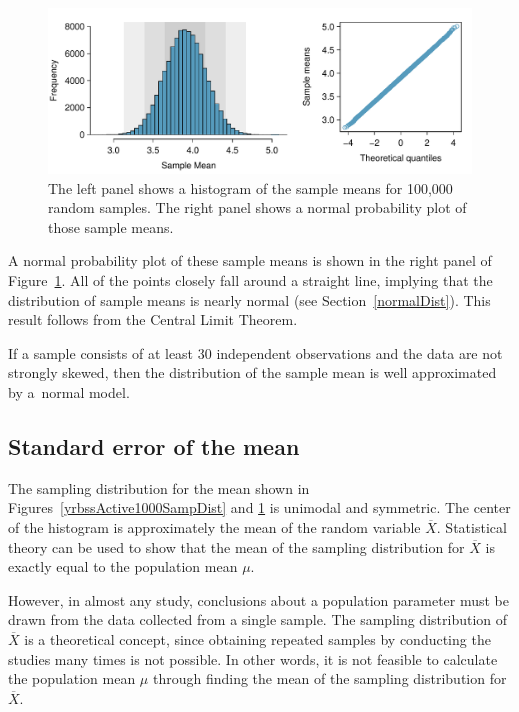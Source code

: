 \begin{spacing}{1.5}
\begin{figure}[hht]
 	\centering
 	\includegraphics[width=\textwidth]
 	{ch_inference_foundations_oi_biostat/figures/yrbssActiveBigSampDist/yrbssActiveBigSampDist}
 	\caption{The left panel shows a histogram of the sample means for 100,000 random samples. The right panel shows a normal probability plot of those sample means.}
 	\label{yrbssActiveBigSampDist}
\end{figure}
 
 A normal probability plot of these sample means is shown in the right panel of Figure~\ref{yrbssActiveBigSampDist}. All of the points closely fall around a straight line, implying that the distribution of sample means is nearly normal (see Section~\ref{normalDist}). This result follows from the Central Limit Theorem.
 
 \begin{termBox}{
 		If a sample consists of at least 30 independent observations and the data are not strongly skewed, then the distribution of the sample mean is well approximated by a~normal model.}
 \end{termBox}

\subsection{Standard error of the mean}
\label{seOfTheMean}

The sampling distribution for the mean shown in Figures~\ref{yrbssActive1000SampDist} and \ref{yrbssActiveBigSampDist} is unimodal and symmetric. The center of the histogram is approximately the mean of the random variable $\overline{X}$. Statistical theory can be used to show that the mean of the sampling distribution for $\overline{X}$ is exactly equal to the population mean $\mu$.

However, in almost any study, conclusions about a population parameter must be drawn from the data collected from a single sample. The sampling distribution of $\overline{X}$ is a theoretical concept, since obtaining repeated samples by conducting the studies many times is not possible. In other words, it is not feasible to calculate the population mean $\mu$ through finding the mean of the sampling distribution for $\overline{X}$.


\end{spacing}
